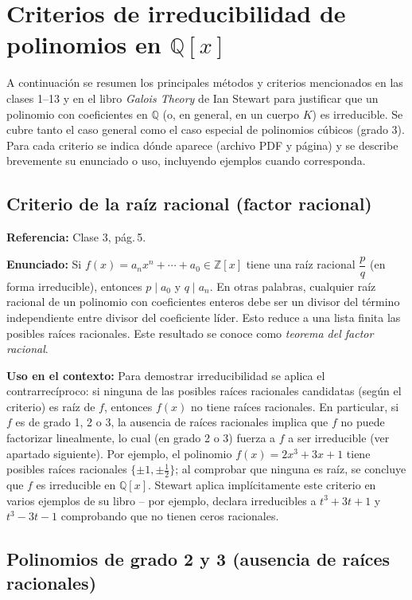 \documentclass[12pt, letter]{article}
\begin{document}
\section*{Criterios de irreducibilidad de polinomios en $\mathbb{Q}[x]$}

A continuación se resumen los principales métodos y criterios mencionados en las clases 1–13 y en el libro \emph{Galois Theory} de Ian Stewart para justificar que un polinomio con coeficientes en $\mathbb{Q}$ (o, en general, en un cuerpo $K$) es irreducible.  
Se cubre tanto el caso general como el caso especial de polinomios cúbicos (grado 3).  
Para cada criterio se indica dónde aparece (archivo PDF y página) y se describe brevemente su enunciado o uso, incluyendo ejemplos cuando corresponda.

\subsection*{Criterio de la raíz racional (factor racional)}

\textbf{Referencia:} Clase 3, pág.\,5.

\textbf{Enunciado:}  
Si $f(x)=a_n x^{n}+\cdots+a_0\in\mathbb{Z}[x]$ tiene una raíz racional $\dfrac{p}{q}$ (en forma irreducible), entonces $p\mid a_0$ y $q\mid a_n$.  
En otras palabras, cualquier raíz racional de un polinomio con coeficientes enteros debe ser un divisor del término independiente entre divisor del coeficiente líder.  
Esto reduce a una lista finita las posibles raíces racionales.  
Este resultado se conoce como \emph{teorema del factor racional}.

\textbf{Uso en el contexto:}  
Para demostrar irreducibilidad se aplica el contrarrecíproco: si ninguna de las posibles raíces racionales candidatas (según el criterio) es raíz de $f$, entonces $f(x)$ no tiene raíces racionales.  
En particular, si $f$ es de grado 1, 2 o 3, la ausencia de raíces racionales implica que $f$ no puede factorizar linealmente, lo cual (en grado 2 o 3) fuerza a $f$ a ser irreducible (ver apartado siguiente).  
Por ejemplo, el polinomio $f(x)=2x^{3}+3x+1$ tiene posibles raíces racionales $\{\pm1,\pm\frac12\}$; al comprobar que ninguna es raíz, se concluye que $f$ es irreducible en $\mathbb{Q}[x]$.  
Stewart aplica implícitamente este criterio en varios ejemplos de su libro – por ejemplo, declara irreducibles a $t^{3}+3t+1$ y $t^{3}-3t-1$ comprobando que no tienen ceros racionales.

\subsection*{Polinomios de grado 2 y 3 (ausencia de raíces racionales)}
\end{document}
